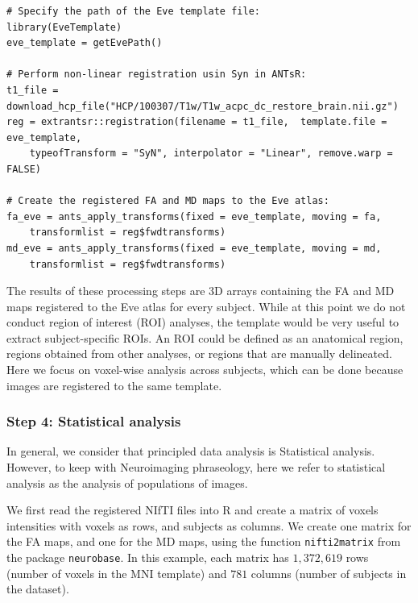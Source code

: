 \documentclass[]{elsarticle} %
\begin{document}
\color{blue}
\begin{verbatim}
# Specify the path of the Eve template file:
library(EveTemplate)
eve_template = getEvePath()

# Perform non-linear registration usin Syn in ANTsR:
t1_file = download_hcp_file("HCP/100307/T1w/T1w_acpc_dc_restore_brain.nii.gz")
reg = extrantsr::registration(filename = t1_file,  template.file = eve_template, 
    typeofTransform = "SyN", interpolator = "Linear", remove.warp = FALSE)

# Create the registered FA and MD maps to the Eve atlas:
fa_eve = ants_apply_transforms(fixed = eve_template, moving = fa, 
    transformlist = reg$fwdtransforms)
md_eve = ants_apply_transforms(fixed = eve_template, moving = md,
    transformlist = reg$fwdtransforms)    
\end{verbatim}
\color{black}
The results of these processing steps are $3$D arrays containing the FA and MD maps registered to the Eve atlas for every subject. While at this point we do not conduct region of interest (ROI) analyses, the template would be very useful to extract subject-specific ROIs. An ROI could be defined as an anatomical region, regions obtained from other analyses, or regions that are manually delineated. Here we focus on voxel-wise analysis across subjects, which can be done because images are registered to the same template.

\subsubsection{Step 4: Statistical analysis} 
In general, we consider that principled data analysis is Statistical analysis. However, to keep with Neuroimaging phraseology, here we refer to statistical analysis as the analysis of populations of images.

We first read the registered NIfTI files into R and create a matrix of voxels intensities with voxels as rows, and subjects as columns. We create one matrix for the FA maps, and one for the MD maps, using the  function \texttt{nifti2matrix} from the package \texttt{neurobase}. In this example, each matrix has $1,372,619$ rows (number of voxels in the MNI template) and $781$ columns (number of subjects in the dataset). 
\end{document}
